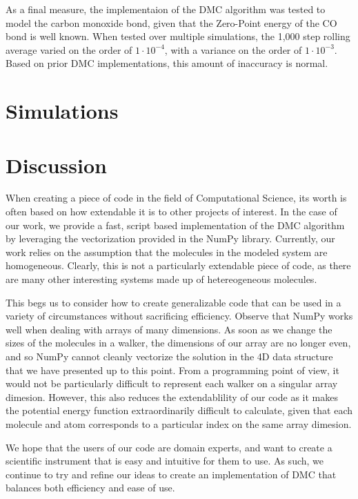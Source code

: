 \documentclass[journal=jacsat,manuscript=article]{achemso}
\begin{document}
As a final measure, the implementaion of the DMC algorithm was tested to model the carbon monoxide bond, given that the Zero-Point energy of the CO bond is well known. When tested over multiple simulations, the 1,000 step rolling average varied on the order of  $1\cdot10^{-4}$, with a variance on the order of $1\cdot10^{-3}$. Based on prior DMC implementations, this amount of inaccuracy is normal.  

\section{Simulations}

\section{Discussion}
When creating a piece of code in the field of Computational Science, its worth is often based on how extendable it is to other projects of interest. In the case of our work, we provide a fast, script based implementation of the DMC algorithm by leveraging the vectorization provided in the NumPy library. Currently, our work relies on the assumption that the molecules in the modeled system are homogeneous. Clearly, this is not a particularly extendable piece of code, as there are many other interesting systems made up of hetereogeneous molecules. 

This begs us to consider how to create generalizable code that can be used in a variety of circumstances without sacrificing efficiency. Observe that NumPy works well when dealing with arrays of many dimensions. As soon as we change the sizes of the molecules in a walker, the dimensions of our array are no longer even, and so NumPy cannot cleanly vectorize the solution in the 4D data structure that we have presented up to this point. From a programming point of view, it would not be particularly difficult to represent each walker on a singular array dimesion. However, this also reduces the extendablility of our code as it makes the potential energy function extraordinarily difficult to calculate, given that each molecule and atom corresponds to a particular index on the same array dimesion. 

We hope that the users of our code are domain experts, and want to create a scientific instrument that is easy and intuitive for them to use. As such, we continue to try and refine our ideas to create an implementation of DMC that balances both efficiency and ease of use. 
\end{document}

